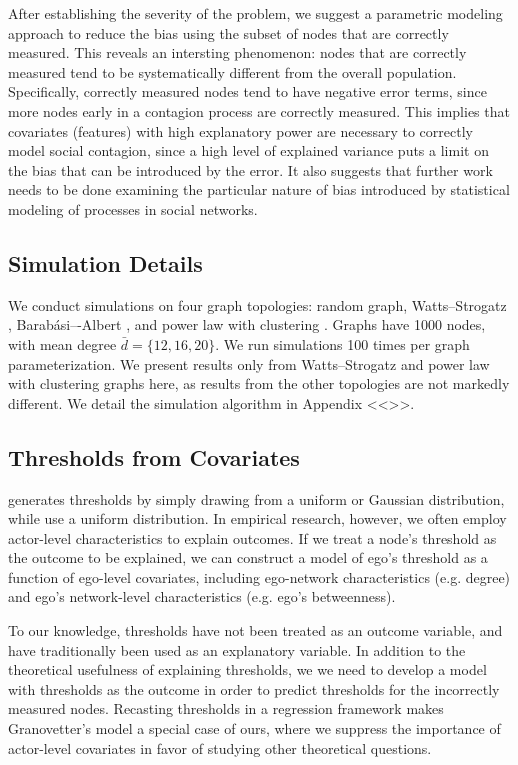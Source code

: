 \documentclass[a4paper]{article}
\begin{document}
After establishing the severity of the problem, we suggest a parametric modeling approach to reduce the bias using the subset of nodes that are correctly measured. This reveals an intersting phenomenon: nodes that are correctly measured tend to be systematically different from the overall population. Specifically, correctly measured nodes tend to have negative error terms, since more nodes early in a contagion process are correctly measured. This implies that covariates (features) with high explanatory power are necessary to correctly model social contagion, since a high level of explained variance puts a limit on the bias that can be introduced by the error. It also suggests that further work needs to be done examining the particular nature of bias introduced by statistical modeling of processes in social networks.

\subsection{Simulation Details}

We conduct simulations on four graph topologies: random graph, Watts--Strogatz \parencite{Watts1998}, Barabási–-Albert \parencite{Barabasi1999}, and power law with clustering \parencite{Holme2002}. Graphs have 1000 nodes, with mean degree $\bar{d} = \{12, 16, 20\}$. We run simulations 100 times per graph parameterization. We present results only from Watts--Strogatz and power law with clustering graphs here, as results from the other topologies are not markedly different. We detail the simulation algorithm in Appendix <<>>.

\subsection{Thresholds from Covariates}

\cite{Granovetter1978} generates thresholds by simply drawing from a uniform or Gaussian distribution, while \cite{Watts2002,Kempe2003} use a uniform distribution. In empirical research, however, we often employ actor-level characteristics to explain outcomes. If we treat a node's threshold as the outcome to be explained, we can construct a model of ego's threshold as a function of ego-level covariates, including ego-network characteristics (e.g. degree) and ego's network-level characteristics (e.g. ego's betweenness).

To our knowledge, thresholds have not been treated as an outcome variable, and have traditionally been used as an explanatory variable. In addition to the theoretical usefulness of explaining thresholds, we we need to develop a model with thresholds as the outcome in order to predict thresholds for the incorrectly measured nodes. Recasting thresholds in a regression framework makes Granovetter's model a special case of ours, where we suppress the importance of actor-level covariates in favor of studying other theoretical questions.
\end{document}
